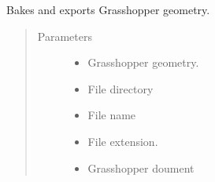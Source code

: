 \documentclass[letterpaper,10pt,english]{sphinxmanual}
\begin{document}

\begin{fulllineitems}
\label{\detokenize{lib:livestock.lib.geometry.bake_export_delete}}
Bakes and exports Grasshopper geometry.
\begin{quote}\begin{description}
\item[{Parameters}] \leavevmode\begin{itemize}
\item {} 
 \textendash{} Grasshopper geometry.

\item {} 
 \textendash{} File directory

\item {} 
 \textendash{} File name

\item {} 
 \textendash{} File extension.

\item {} 
 \textendash{} Grasshopper doument

\end{itemize}

\end{description}\end{quote}

\end{fulllineitems}

\end{document}
